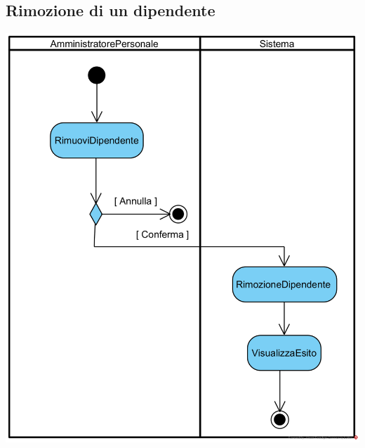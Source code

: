 \documentclass[12pt]{article}
\begin{document}
\subsection{Rimozione di un dipendente}
\begin{center}
\includegraphics[width=\textwidth]{ActivityDiagram/AmministratorePersonaleRimuoveDipendente}
\end{center}
\end{document}
